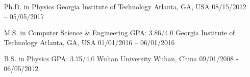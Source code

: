 


\begin{cventries}

\cveducation
{Ph.D. in Physics}
{}
{Georgia Institute of Technology}
{Atlanta, GA, USA}
{08/15/2012 -- 05/05/2017}
{
}
\vspace{-0.5em}

\cveducation
{M.S. in Computer Science \& Engineering }
{GPA: 3.86/4.0}
{Georgia Institute of Technology}
{Atlanta, GA, USA}
{01/01/2016 -- 06/01/2016}
{
}
\vspace{-0.5em}

\cveducation
{B.S. in Physics} %
{GPA: 3.75/4.0}
{Wuhan University} %
{Wuhan, China} %
{09/01/2008 - 06/05/2012}
{    
}
\vspace{-0.5em}



\end{cventries}
